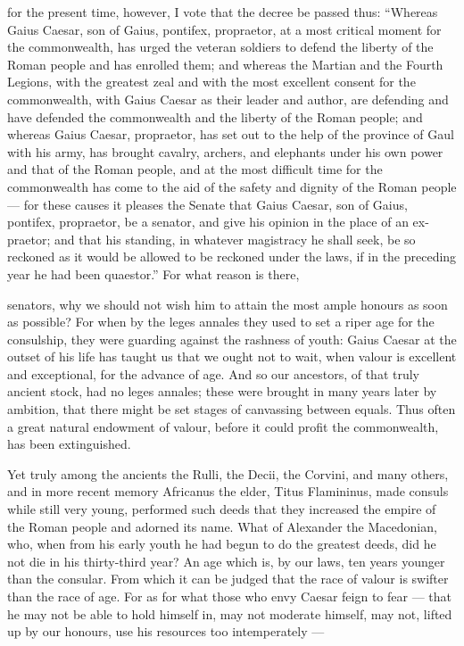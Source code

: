  for the present time, however, I vote that the decree be passed thus: ``Whereas Gaius Caesar, son of Gaius, pontifex, propraetor, at a most critical moment for the commonwealth, has urged the veteran soldiers to defend the liberty of the Roman people and has enrolled them; and whereas the Martian and the Fourth Legions, with the greatest zeal and with the most excellent consent for the commonwealth, with Gaius Caesar as their leader and author, are defending and have defended the commonwealth and the liberty of the Roman people; and whereas Gaius Caesar, propraetor, has set out to the help of the province of Gaul with his army, has brought cavalry, archers, and elephants under his own power and that of the Roman people, and at the most difficult time for the commonwealth has come to the aid of the safety and dignity of the Roman people --- for these causes it pleases the Senate that Gaius Caesar, son of Gaius, pontifex, propraetor, be a senator, and give his opinion in the place of an ex-praetor; and that his standing, in whatever magistracy he shall seek, be so reckoned as it would be allowed to be reckoned under the laws, if in the preceding year he had been quaestor.'' For what reason is there,

 senators, why we should not wish him to attain the most ample honours as soon as possible? For when by the leges annales they used to set a riper age for the consulship, they were guarding against the rashness of youth: Gaius Caesar at the outset of his life has taught us that we ought not to wait, when valour is excellent and exceptional, for the advance of age. And so our ancestors, of that truly ancient stock, had no leges annales; these were brought in many years later by ambition, that there might be set stages of canvassing between equals. Thus often a great natural endowment of valour, before it could profit the commonwealth, has been extinguished.

 Yet truly among the ancients the Rulli, the Decii, the Corvini, and many others, and in more recent memory Africanus the elder, Titus Flamininus, made consuls while still very young, performed such deeds that they increased the empire of the Roman people and adorned its name. What of Alexander the Macedonian, who, when from his early youth he had begun to do the greatest deeds, did he not die in his thirty-third year? An age which is, by our laws, ten years younger than the consular. From which it can be judged that the race of valour is swifter than the race of age. For as for what those who envy Caesar feign to fear --- that he may not be able to hold himself in, may not moderate himself, may not, lifted up by our honours, use his resources too intemperately ---

